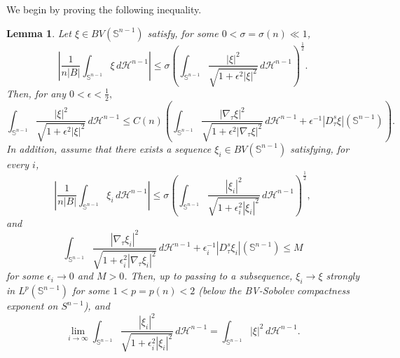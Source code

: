 \documentclass[reqno,11pt]{amsart}
\makeatletter
\def\ez{\epsilon}
\def\sz{\sigma}
\newtheorem{lem}[thm]{Lemma}%
\numberwithin{equation}{section}
\theoremstyle{remark}
\makeatother
\begin{document}
We begin by proving the following inequality.
\begin{lem}\label{strong l2}
Let $\xi \in {BV(\mathbb S^{n-1})}$ satisfy, for some  $0<\sz=\sz(n)\ll1$,
\begin{equation}\label{small average}
    \left|\frac{1}{ n|B|}\int_{\mathbb S^{n-1}}\xi\,  d\mathscr H^{n-1}\right|\le \sz \left(\int_{\mathbb S^{n-1}} \frac{|\xi|^2}{\sqrt{1+\ez^2|\xi|^2}} \,d\mathscr H^{n-1}\right)^{\frac 1 2}.
\end{equation}
 Then,  for any $0<\ez<\frac 1 2,$
$$   \int_{\mathbb S^{n-1}} \frac{|\xi|^2}{\sqrt{1+\ez^2|\xi|^2}} \,d\mathscr H^{n-1}\le C(n)\left( \int_{\mathbb S^{n-1}} \frac{|\nabla_\tau  \xi|^2}{\sqrt{1+\ez^2|\nabla_\tau \xi|^2}} \,
 d\mathscr H^{n-1}+\ez^{-1} |D^s_\tau \xi|(\mathbb S^{n-1})\right).$$
In addition, assume that there exists a sequence $\xi_i\in BV(\mathbb S^{n-1})$ satisfying, for every $i$,
\begin{equation}\label{small average seq}
    \left|\frac{1}{ n|B|}\int_{\mathbb S^{n-1}}\xi_i\,  d\mathscr H^{n-1}\right|\le \sz \left(\int_{\mathbb S^{n-1}} \frac{|\xi_i|^2}{\sqrt{1+\ez_i^2|\xi_i|^2}} \,d\mathscr H^{n-1}\right)^{\frac 1 2},
\end{equation}
and
$$\int_{\mathbb S^{n-1}} \frac{|\nabla_\tau  \xi_i|^2}{\sqrt{1+\ez_i^2|\nabla_\tau \xi_i|^2}} \,
 d\mathscr H^{n-1}+ \epsilon_i^{-1}|D^s_\tau \xi_i|(\mathbb S^{n-1})\le M$$
for some $\ez_i\to 0$ and $M>0$.
Then, up to passing to a subsequence,
$\xi_i \to \xi$   strongly in $L^p (\mathbb S^{n-1})$ for some $1<p=p(n)<2$ (below the BV-Sobolev compactness exponent on $S^{n-1}$),
and
\begin{equation}
    \label{eq:xi_i to xi}
\lim_{i\to \infty}\int_{\mathbb S^{n-1}} \frac{|\xi_i|^2}{\sqrt{1+\ez_i^2|\xi_i|^2}} \,d\mathscr H^{n-1}=  \int_{\mathbb S^{n-1}} {|\xi|^2}  \,d\mathscr H^{n-1}.
\end{equation}
\end{lem}
\end{document}
